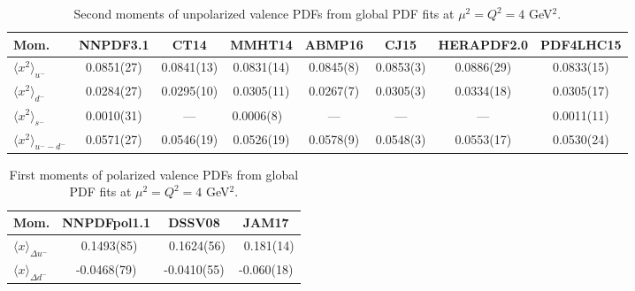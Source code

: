 \begin{table}[!t]
\centering
\small
\begin{tabular}{lccccccc}
\toprule
Mom. & NNPDF3.1 & CT14 & MMHT14 & ABMP16 & CJ15 & HERAPDF2.0 & PDF4LHC15 \\
\midrule
$\langle x^2\rangle_{u^-}$ 
& 0.0851(27) & 0.0841(13) & 0.0831(14)    
& 0.0845(8) & 0.0853(3) & 0.0886(29) & 0.0833(15) \\
$\langle x^2\rangle_{d^-}$
& 0.0284(27) & 0.0295(10) & 0.0305(11)    
& 0.0267(7) & 0.0305(3) & 0.0334(18) & 0.0305(17) \\ 
$\langle x^2\rangle_{s^-}$
& 0.0010(31) & ---        & 0.0006(8)\ \, 
& ---       & ---       & ---        & 0.0011(11) \\
$\langle x^2\rangle_{u^--d^-}$
& 0.0571(27) & 0.0546(19) & 0.0526(19)    
& 0.0578(9) & 0.0548(3) & 0.0553(17) & 0.0530(24) \\
\bottomrule
\end{tabular}
\caption{\small Second moments of unpolarized valence PDFs from 
global PDF fits at $\mu^2=Q^2=4$ GeV$^2$.}
\label{tab:unpHmoms}
\end{table}

\begin{table}[!t]
\centering
\footnotesize
\begin{tabular}{lccc}
\toprule
Mom. & NNPDFpol1.1 & DSSV08 & JAM17\\
\midrule
$\langle x\rangle_{\Delta u^-}$ 
& \ 0.1493(85) & \ 0.1624(56) & \ 0.181(14)\\
$\langle x\rangle_{\Delta d^-}$ 
&  -0.0468(79) &  -0.0410(55) &  -0.060(18)\\
\bottomrule
\end{tabular}
\caption{\small First moments of polarized valence PDFs from global 
PDF fits at $\mu^2=Q^2=4$ GeV$^2$.}
\label{tab:polHmoms}
\end{table}

